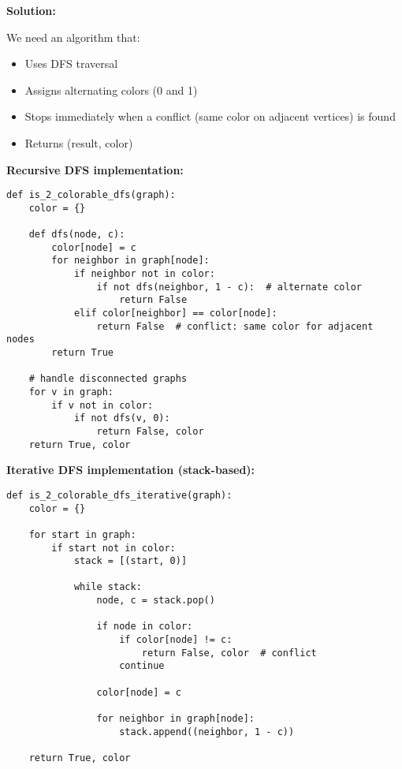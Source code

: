 \documentclass[12pt,a4paper]{article}
\begin{document}
\textbf{Solution:} 

We need an algorithm that:
\begin{itemize}
\item Uses DFS traversal
\item Assigns alternating colors (0 and 1)
\item Stops immediately when a conflict (same color on adjacent vertices) is found
\item Returns (result, color)
\end{itemize}

\textbf{Recursive DFS implementation:}

\begin{lstlisting}[caption=Recursive DFS 2-Colorability Detection, label=lst:dfs_recursive]
def is_2_colorable_dfs(graph):
    color = {}
    
    def dfs(node, c):
        color[node] = c
        for neighbor in graph[node]:
            if neighbor not in color:
                if not dfs(neighbor, 1 - c):  # alternate color
                    return False
            elif color[neighbor] == color[node]:
                return False  # conflict: same color for adjacent nodes
        return True
    
    # handle disconnected graphs
    for v in graph:
        if v not in color:
            if not dfs(v, 0):
                return False, color
    return True, color
\end{lstlisting}

\textbf{Iterative DFS implementation (stack-based):}

\begin{lstlisting}[caption=Iterative DFS 2-Colorability Detection, label=lst:dfs_iterative]
def is_2_colorable_dfs_iterative(graph):
    color = {}
    
    for start in graph:
        if start not in color:
            stack = [(start, 0)]
            
            while stack:
                node, c = stack.pop()
                
                if node in color:
                    if color[node] != c:
                        return False, color  # conflict
                    continue
                
                color[node] = c
                
                for neighbor in graph[node]:
                    stack.append((neighbor, 1 - c))
    
    return True, color
\end{lstlisting}
\end{document}
